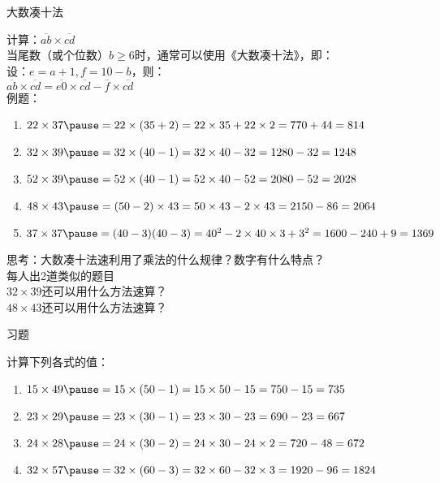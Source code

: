 \documentclass[aspectratio=169]{ctexbeamer} %
\begin{document}
\begin{frame}[t]{大数凑十法}
\begin{spacing}{1.2}
\normalsize
计算：$\overline{ab} \times \overline{cd}$ \\
当尾数（或个位数）$b \ge 6$时，通常可以使用《大数凑十法》，即：\\
设：$e = a+1, f = 10-b$，则：\\
$\overline{ab} \times \overline{cd} = \overline{e0} \times \overline{cd} - \overline{f} \times \overline{cd}$ \\
例题：
\begin{enumerate}[label={\arabic*.}]
\item $22 \times 37 \pause = 22 \times (35+2) = 22 \times 35 + 22 \times 2 = 770 + 44 = 814$
\item $32 \times 39 \pause = 32 \times (40-1)=32 \times 40 - 32=1280-32=1248$
\item $52 \times 39 \pause = 52 \times (40-1)=52 \times 40 - 52=2080-52=2028$
\item $48 \times 43 \pause = (50-2) \times 43=50 \times 43 - 2 \times 43=2150-86=2064$
\item $37 \times 37 \pause = (40-3)(40-3)=40^2 - 2\times40\times3 +3^2=1600-240+9=1369$

\end{enumerate}
\alert{思考：大数凑十法速利用了乘法的什么规律？数字有什么特点？}\\
\alert{每人出2道类似的题目}  \\
\alert{$32 \times 39 $还可以用什么方法速算？} \\
\alert{$48 \times 43 $还可以用什么方法速算？}
\end{spacing}
\end{frame}

\begin{frame}[t]{习题}
\begin{spacing}{1.2}
\normalsize
计算下列各式的值：
\begin{enumerate}[label={\arabic*.}]
\item $15 \times 49 \pause = 15 \times (50-1) = 15 \times 50 - 15 = 750 - 15 = 735$
\item $23 \times 29 \pause = 23 \times (30-1) = 23 \times 30 - 23 = 690 - 23 = 667$
\item $24 \times 28 \pause = 24 \times (30-2) = 24 \times 30 - 24 \times 2 = 720 - 48 = 672$
\item $32 \times 57 \pause = 32 \times (60-3) = 32 \times 60 - 32 \times 3 = 1920 - 96 = 1824$
\end{enumerate}

\end{spacing}
\end{frame}
\end{document}
